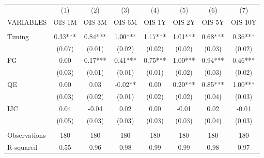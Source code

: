 \begin{tabular}{lccccccc} \hline
 & (1) & (2) & (3) & (4) & (5) & (6) & (7) \\
VARIABLES & OIS 1M & OIS 3M & OIS 6M & OIS 1Y & OIS 2Y & OIS 5Y & OIS 10Y \\ \hline
 &  &  &  &  &  &  &  \\
Timing & 0.33*** & 0.84*** & 1.00*** & 1.17*** & 1.01*** & 0.68*** & 0.36*** \\
 & (0.07) & (0.01) & (0.02) & (0.02) & (0.02) & (0.03) & (0.02) \\
FG & 0.00 & 0.17*** & 0.41*** & 0.75*** & 1.00*** & 0.94*** & 0.46*** \\
 & (0.03) & (0.01) & (0.01) & (0.01) & (0.02) & (0.03) & (0.02) \\
QE & 0.00 & 0.03 & -0.02** & 0.00 & 0.20*** & 0.85*** & 1.00*** \\
 & (0.03) & (0.02) & (0.01) & (0.02) & (0.02) & (0.04) & (0.03) \\
IJC & 0.04 & -0.04 & 0.02 & 0.00 & -0.01 & 0.02 & -0.01 \\
 & (0.05) & (0.03) & (0.03) & (0.03) & (0.03) & (0.04) & (0.03) \\
 &  &  &  &  &  &  &  \\
Observations & 180 & 180 & 180 & 180 & 180 & 180 & 180 \\
 R-squared & 0.55 & 0.96 & 0.98 & 0.99 & 0.99 & 0.98 & 0.97 \\ \hline
\end{tabular}
